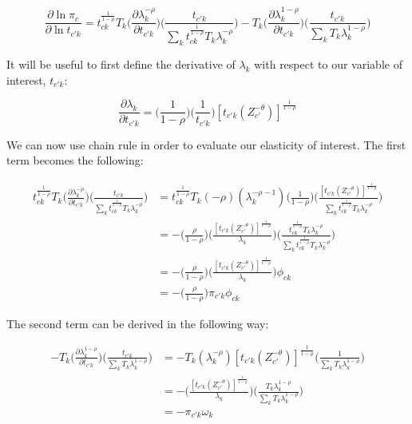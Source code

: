 \documentclass[10pt]{article}
\begin{document}
\begin{equation*}
    \frac{\partial\ln{\pi_{c}}}{\partial\ln{t_{{c'}k}}} = {t^{\frac{1}{1-\rho}}_{ck}}{T_{k}}\Big(\frac{\partial\lambda_{k}^{-\rho}}{\partial{t_{{c'}k}}}\Big)\Big(\frac{t_{{c'}k}}{{\sum\limits_{k}{t^{\frac{1}{1-\rho}}_{ck}}{T_{k}}\lambda_{k}^{-\rho}}}\Big) - {T_{k}}\Big(\frac{\partial\lambda_{k}^{1-\rho}}{\partial{t_{{c'}k}}}\Big)\Big(\frac{t_{{c'}k}}{{\sum\limits_{k}{T_{k}}\lambda_{k}^{1-\rho}}}\Big)
\end{equation*}

It will be useful to first define the derivative of $\lambda_{k}$ with respect to our variable of interest, $t_{{c'}k}$:

\begin{equation*}
    \frac{\partial{\lambda_{k}}}{\partial{t_{{c'}k}}} = \Big(\frac{1}{1-\rho}\Big)\Big(\frac{1}{t_{{c'}k}}\Big)[{t_{{c'}k}}(Z_{c'}^{-\theta})]^{\frac{1}{1-\rho}}
\end{equation*}

We can now use chain rule in order to evaluate our elasticity of interest. The first term becomes the following:

\begin{align*}
    {t^{\frac{1}{1-\rho}}_{ck}}{T_{k}}\Big(\frac{\partial\lambda_{k}^{-\rho}}{\partial{t_{{c'}k}}}\Big)\Big(\frac{t_{{c'}k}}{{\sum\limits_{k}{t^{\frac{1}{1-\rho}}_{ck}}{T_{k}}\lambda_{k}^{-\rho}}}\Big) & = {t^{\frac{1}{1-\rho}}_{ck}}{T_{k}}(-\rho)(\lambda_{k}^{-\rho-1})\Big(\frac{1}{1-\rho}\Big)\Bigg(\frac{[{t_{{c'}k}}(Z_{c'}^{-\theta})]^{\frac{1}{1-\rho}}}{{\sum\limits_{k}{t^{\frac{1}{1-\rho}}_{ck}}{T_{k}}\lambda_{k}^{-\rho}}}\Bigg) \\ &= -\Bigg(\frac{\rho}{1-\rho}\Bigg)\Bigg(\frac{[{t_{{c'}k}}(Z_{c'}^{-\theta})]^{\frac{1}{1-\rho}}}{\lambda_{k}}\Bigg)\Bigg(\frac{t^{\frac{1}{1-\rho}}_{ck}{T_{k}}{\lambda^{-\rho}_{k}}}{{\sum\limits_{k}{t^{\frac{1}{1-\rho}}_{ck}}{T_{k}}\lambda_{k}^{-\rho}}}\Bigg)\\ &= -\Bigg(\frac{\rho}{1-\rho}\Bigg)\Bigg(\frac{[{t_{{c'}k}}(Z_{c'}^{-\theta})]^{\frac{1}{1-\rho}}}{\lambda_{k}}\Bigg){\phi_{ck}}\\ &= -\Big(\frac{\rho}{1-\rho}\Big){\pi_{{c'}k}}{\phi_{ck}}
\end{align*}

The second term can be derived in the following way:

\begin{align*}
    - {T_{k}}\Big(\frac{\partial\lambda_{k}^{1-\rho}}{\partial{t_{{c'}k}}}\Big)\Big(\frac{t_{{c'}k}}{{\sum\limits_{k}{T_{k}}\lambda_{k}^{1-\rho}}}\Big) & = - {T_{k}}(\lambda_{k}^{-\rho})[{t_{{c'}k}}(Z_{c'}^{-\theta})]^{\frac{1}{1-\rho}}\Big(\frac{1}{{\sum\limits_{k}{T_{k}}\lambda_{k}^{1-\rho}}}\Big) \\ &= - \Bigg(\frac{[{t_{{c'}k}}(Z_{c'}^{-\theta})]^{\frac{1}{1-\rho}}}{\lambda_{k}}\Bigg)\Big(\frac{{T_{k}}{\lambda_{k}^{1-\rho}}}{{\sum\limits_{k} T_k \lambda_{k}^{1-\rho}}}\Big)\\ &= -\pi_{{c'}k}{\omega_{k}}
\end{align*}
\end{document}
